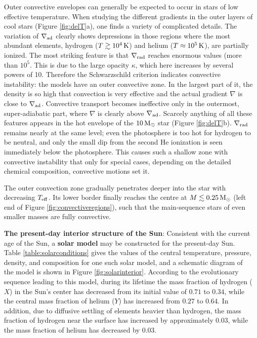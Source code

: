 \documentclass[a4paper,10pt]{article}
\begin{document}
{\noindent}Outer convective envelopes can generally be expected to occur in stars of low effective temperature. When studying the different gradients in the outer layers of cool stars (Figure \ref{fig:delT}a), one finds a variety of complicated details. The variation of $\nabla_{\rm ad}$ clearly shows depressions in those regions where the most abundant elements, hydrogen ($T\gtrsim10^4\,{\rm K}$) and helium ($T\approx10^5\,{\rm K}$), are partially ionized. The most striking feature is that $\nabla_{\rm rad}$ reaches enormous values (more than $10^5$. This is due to the large opacity $\kappa$, which here increases by several powers of 10. Therefore the Schwarzschild criterion indicates convective instability: the models have an outer convective zone. In the largest part of it, the density is so high that convection is very effective and the actual gradient $\nabla$ is close to $\nabla_{\rm ad}$. Convective transport becomes ineffective only in the outermost, super-adiabatic part, where $\nabla$ is clearly above $\nabla_{\rm ad}$. Scarcely anything of all these features appears in the hot envelope of the $10\,{\rm M_\odot}$ star (Figure \ref{fig:delT}b). $\nabla_{\rm rad}$ remains nearly at the same level; even the photosphere is too hot for hydrogen to be neutral, and only the small dip from the second He ionization is seen immediately below the photosphere. This causes such a shallow zone with convective instability that only for special cases, depending on the detailed chemical composition, convective motions set it.

{\noindent}The outer convection zone gradually penetrates deeper into the star with decreasing $T_{\rm eff}$. Its lower border finally reaches the centre at $M\lesssim0.25\,{\rm M_\odot}$ (left end of Figure \ref{fig:convectiveregions}), such that the main-sequence stars of even smaller masses are fully convective.

{\noindent}\textbf{The present-day interior structure of the Sun}: Consistent with the current age of the Sun, a \textbf{solar model} may be constructed for the present-day Sun. Table \ref{table:solarconditions} gives the values of the central temperature, pressure, density, and composition for one such solar model, and a schematic diagram of the model is shown in Figure \ref{fig:solarinterior}. According to the evolutionary sequence leading to this model, during its lifetime the mass fraction of hydrogen ($X$) in the Sun's center has decreased from its initial value of $0.71$ to $0.34$, while the central mass fraction of helium ($Y$) has increased from $0.27$ to $0.64$. In addition, due to diffusive settling of elements heavier than hydrogen, the mass fraction of hydrogen near the surface has increased by approximately $0.03$, while the mass fraction of helium has decreased by $0.03$.
\end{document}
